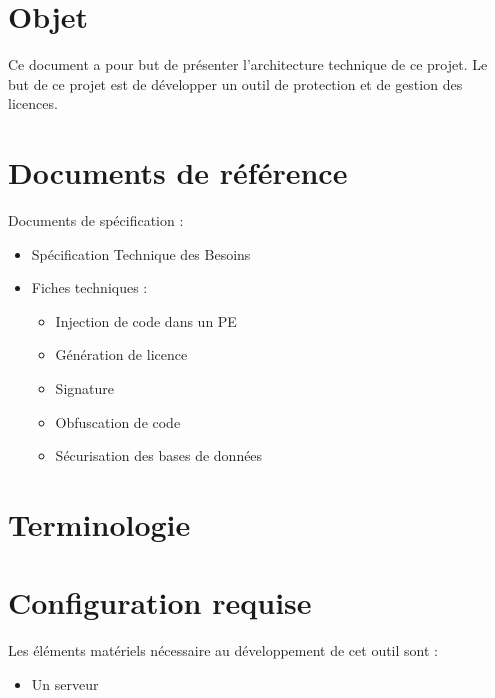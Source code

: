 \chapter{Objet}

Ce document a pour but de présenter l'architecture technique de ce projet. Le but de ce projet est de développer un outil de protection et de gestion des licences.

\chapter{Documents de référence}

Documents de spécification :

\begin{itemize}
    \item Spécification Technique des Besoins
    \item Fiches techniques :
	\begin{itemize}
	    \item Injection de code dans un PE
	    \item Génération de licence
	    \item Signature
	    \item Obfuscation de code
	    \item Sécurisation des bases de données
	\end{itemize}
\end{itemize}

\chapter{Terminologie}

\chapter{Configuration requise}

Les éléments matériels nécessaire au développement de cet outil sont :

\begin{itemize}
    \item Un serveur
\end{itemize}

